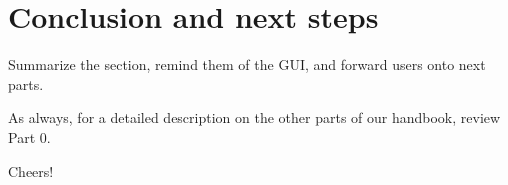 \genHeader
\section{Conclusion and next steps}
\hypertarget{conclusion}{}

Summarize the section, remind them of the GUI, and forward users onto next parts.

As always, for a detailed description on the other parts of our handbook, review Part 0.

Cheers!